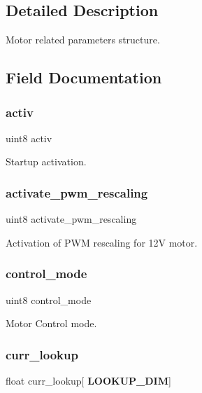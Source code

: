 \subsection{Detailed Description}
Motor related parameters structure. 



\subsection{Field Documentation}
\mbox{\label{structst__motor_a63bbebc1db55f43e0571006597a3488b}} 
\subsubsection{activ}
{\footnotesize\ttfamily uint8 activ}

Startup activation. \mbox{\label{structst__motor_a53d9d645351f4020826ab8c56c91b244}} 
\subsubsection{activate\+\_\+pwm\+\_\+rescaling}
{\footnotesize\ttfamily uint8 activate\+\_\+pwm\+\_\+rescaling}

Activation of P\+WM rescaling for 12V motor. \mbox{\label{structst__motor_af0c55b7d870673f2f6e9521c215d4b51}} 
\subsubsection{control\+\_\+mode}
{\footnotesize\ttfamily uint8 control\+\_\+mode}

Motor Control mode. \mbox{\label{structst__motor_a29cec4cab946141aae2509b04e2f5097}} 
\subsubsection{curr\+\_\+lookup}
{\footnotesize\ttfamily float curr\+\_\+lookup[\textbf{ L\+O\+O\+K\+U\+P\+\_\+\+D\+IM}]}

